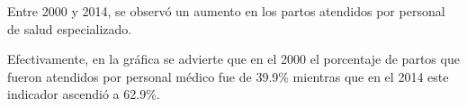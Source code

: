 Entre 2000 y 2014, se observó un aumento en los partos atendidos por personal de salud especializado.

 Efectivamente,  en la gráfica se advierte que   en el 2000  el porcentaje de partos que fueron atendidos por personal médico fue de  39.9\%  mientras que en el 2014 este indicador ascendió a 62.9\%. 